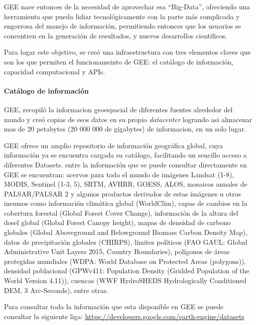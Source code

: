 \documentclass[
]{article}
\begin{document}
GEE nace entonces de la necesidad de aprovechar esa ``Big-Data'',
ofreciendo una herramienta que pueda lidiar tecnológicamente con la
parte más complicada y engorrosa del manejo de información, permitiendo
entonces que los usuarios se concentren en la generación de resultados,
y nuevos desarrollos científicos.

Para logar este objetivo, se creó una infraestructura con tres elementos
claves que son los que permiten el funcionameinto de GEE: el catálogo de
información, capacidad computacional y APIs.

\hypertarget{catuxe1logo-de-informaciuxf3n}{%
\paragraph{Catálogo de
información}\label{catuxe1logo-de-informaciuxf3n}}

GEE, recopiló la informacion geoespacial de diferentes fuentes alrededor
del mundo y creó copias de esos datos en su propio \emph{datacenter}
logrando asi almacenar mas de 20 petabytes (20 000 000 de gigabytes) de
informacion, en un solo lugar.

GEE ofrece un amplio repositorio de información geográfica global, cuya
información ya se encuentra cargada su catálogo, facilitando un sencillo
acceso a diferentes Datasets. entre la información que se puede
consultar directamente en GEE se encuentran: acervos para todo el mundo
de imágenes Landsat (1-8), MODIS, Sentinel (1-3, 5), SRTM, AVHRR, GOESS,
ALOS, mosaicos anuales de PALSAR/PALSAR 2 y algunos productos derivados
de estas imágenes u otros insumos como información climática global
(WorldClim), capas de cambios en la cobertura forestal (Global Forest
Cover Change), información de la altura del dosel global (Global Forest
Canopy height), mapas de densidad de carbono globales (Global
Aboveground and Belowground Biomass Carbon Density Map), datos de
precipitación globales (CHIRPS), límites políticos (FAO GAUL: Global
Administrative Unit Layers 2015, Country Boundaries), polígonos de áreas
protegidas mundiales (WDPA: World Database on Protected Areas
(polygons)), densidad poblacional (GPWv411: Population Density (Gridded
Population of the World Version 4.11)), cuencas (WWF HydroSHEDS
Hydrologically Conditioned DEM, 3 Arc-Seconds), entre otras.

\begin{tipblock}
Para consultar toda la información que esta disponible en GEE se puede
consultar la siguiente liga:
\url{https://developers.google.com/earth-engine/datasets}

\end{tipblock}
\end{document}
